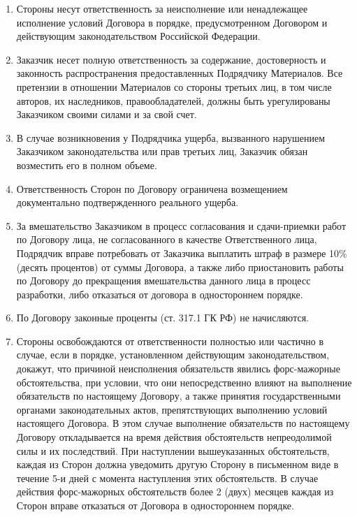 \documentclass[a4paper, fontsize=12bp]{article}
\newcounter{enum}
\begin{document}
\begin{enumerate}[label=\arabic{enum}.\arabic*.]
\item Стороны несут ответственность за неисполнение или ненадлежащее исполнение условий Договора в порядке, предусмотренном Договором и действующим законодательством Российской Федерации.

\item Заказчик несет полную ответственность за содержание, достоверность и законность распространения предоставленных Подрядчику Материалов. Все претензии в отношении Материалов со стороны третьих лиц, в том числе авторов, их наследников, правообладателей, должны быть урегулированы Заказчиком своими силами и за свой счет.

\item В случае возникновения у Подрядчика ущерба, вызванного нарушением Заказчиком законодательства или прав третьих лиц, Заказчик обязан возместить его в полном объеме.

\item Ответственность Сторон по Договору ограничена возмещением документально подтвержденного реального ущерба.

\item За вмешательство Заказчиком в процесс согласования и сдачи-приемки работ по Договору лица, не согласованного в качестве Ответственного лица, Подрядчик вправе потребовать от Заказчика выплатить штраф в размере 10\% (десять процентов) от суммы Договора, а также либо приостановить работы по Договору до прекращения вмешательства данного лица в процесс разработки, либо отказаться от договора в одностороннем порядке.

\item По Договору законные проценты (ст. 317.1 ГК РФ) не начисляются.

\item Стороны освобождаются от ответственности полностью или частично в случае, если в порядке, установленном действующим законодательством, докажут, что причиной неисполнения обязательств явились форс-мажорные обстоятельства, при условии, что они непосредственно влияют на выполнение обязательств по настоящему Договору, а также принятия государственными органами законодательных актов, препятствующих выполнению условий настоящего Договора. В этом случае выполнение обязательств по настоящему Договору откладывается на время действия обстоятельств непреодолимой силы и их
последствий. При наступлении вышеуказанных обстоятельств, каждая из Сторон должна уведомить другую Сторону в письменном виде в течение 5-и дней с момента наступления этих обстоятельств. В случае действия форс-мажорных обстоятельств более 2 (двух) месяцев каждая из Сторон вправе отказаться от Договора в одностороннем порядке.
\end{enumerate}
\end{document}
